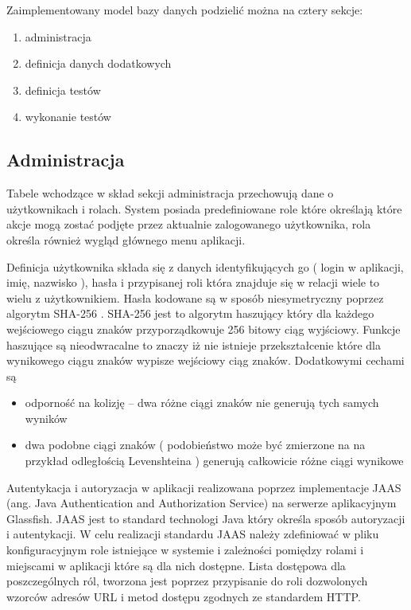   Zaimplementowany model bazy danych podzielić można na cztery sekcje:
  \begin{enumerate}
    \item administracja
    \item definicja danych dodatkowych
    \item definicja testów
    \item wykonanie testów
  \end{enumerate}
  
 
  
\subsection{Administracja}  


Tabele wchodzące w skład sekcji administracja przechowują dane o użytkownikach i rolach. System posiada predefiniowane role które określają które akcje mogą zostać podjęte przez aktualnie zalogowanego użytkownika, rola określa również wygląd głównego menu aplikacji.

Definicja użytkownika składa się z danych identyfikujących go ( login w aplikacji, imię, nazwisko ), hasła i przypisanej roli która znajduje się w relacji wiele to wielu z użytkownikiem. Hasła kodowane są w sposób niesymetryczny poprzez algorytm SHA-256 \cite{sha2}.  SHA-256 jest to algorytm haszujący \cite{hash} który dla każdego wejściowego ciągu znaków przyporządkowuje 256 bitowy ciąg wyjściowy. Funkcje haszujące są nieodwracalne to znaczy iż nie istnieje przekształcenie które dla wynikowego ciągu znaków wypisze wejściowy ciąg znaków. Dodatkowymi cechami są
\begin{itemize}
  \item  odporność na kolizję --  dwa różne ciągi znaków nie generują tych samych wyników 
  \item dwa podobne ciągi znaków ( podobieństwo może być zmierzone na na przykład odległością Levenshteina\cite{Levenshtein} ) generują całkowicie różne ciągi wynikowe
\end{itemize}

Autentykacja i autoryzacja w aplikacji realizowana poprzez implementacje JAAS\cite{jaas} (ang. Java Authentication and Authorization Service) na serwerze aplikacyjnym Glassfish. JAAS jest to standard technologi Java który określa sposób autoryzacji i autentykacji. W celu realizacji standardu JAAS należy zdefiniować w pliku konfiguracyjnym role istniejące w systemie i zależności pomiędzy rolami i miejscami w aplikacji które są dla nich dostępne. Lista dostępowa dla poszczególnych ról, tworzona jest poprzez przypisanie do roli dozwolonych wzorców adresów URL i metod dostępu zgodnych ze standardem HTTP.

